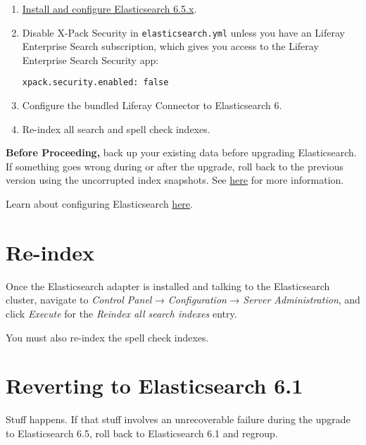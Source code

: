 \begin{enumerate}
\def\labelenumi{\arabic{enumi}.}
\item
  \href{/docs/7-2/deploy/-/knowledge_base/d/elasticsearch}{Install and
  configure Elasticsearch 6.5.x}.
\item
  Disable X-Pack Security in \texttt{elasticsearch.yml} unless you have
  an Liferay Enterprise Search subscription, which gives you access to
  the Liferay Enterprise Search Security app:

\begin{verbatim}
xpack.security.enabled: false
\end{verbatim}
\item
  Configure the bundled Liferay Connector to Elasticsearch 6.
\item
  Re-index all search and spell check indexes.
\end{enumerate}

\noindent\hrulefill

\textbf{Before Proceeding,} back up your existing data before upgrading
Elasticsearch. If something goes wrong during or after the upgrade, roll
back to the previous version using the uncorrupted index snapshots. See
\href{/docs/7-2/deploy/-/knowledge_base/d/backing-up-elasticsearch}{here}
for more information.

\noindent\hrulefill

Learn about configuring Elasticsearch
\href{/docs/7-2/deploy/-/knowledge_base/d/configuring-the-liferay-elasticsearch-connector}{here}.

\section{Re-index}\label{re-index}

Once the Elasticsearch adapter is installed and talking to the
Elasticsearch cluster, navigate to \emph{Control Panel} →
\emph{Configuration} → \emph{Server Administration}, and click
\emph{Execute} for the \emph{Reindex all search indexes} entry.

You must also re-index the spell check indexes.

\section{Reverting to Elasticsearch
6.1}\label{reverting-to-elasticsearch-6.1}

Stuff happens. If that stuff involves an unrecoverable failure during
the upgrade to Elasticsearch 6.5, roll back to Elasticsearch 6.1 and
regroup.

